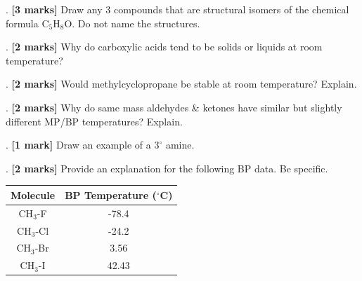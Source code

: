 \documentclass[11pt,letterpaper]{article}
\begin{document}
\newpage
\noindent


\vspace{0.4cm}
. \textbf{[3 marks]} Draw any 3 compounds that are structural isomers of the chemical formula $\text{C}_5\text{H}_8\text{O}$. Do not name the structures.
\vspace{4.0cm}

. \textbf{[2 marks]} Why do carboxylic acids tend to be solids or liquids at room temperature?
\vspace{2.0cm}

. \textbf{[2 marks]} Would methylcyclopropane \;\; be stable at room temperature? Explain.
\vspace{2.5cm}

. \textbf{[2 marks]} Why do same mass aldehydes \& ketones have similar but slightly different MP/BP temperatures? Explain.
\vspace{2.5cm}

. \textbf{[1 mark]} Draw an example of a $3^\circ$ amine.
\vspace{2.0cm}

. \textbf{[2 marks]} Provide an explanation for the following BP data. Be specific.

\vspace{0.3cm}
\noindent
\begin{minipage}[t]{0.55\textwidth}
\vspace{0.1cm}
\vspace{3.0cm}
\end{minipage}
\hfill
\begin{minipage}[t]{0.4\textwidth}
\centering
\begin{tabular}{|c|c|}
\hline
\textbf{Molecule} & \textbf{BP Temperature ($^\circ$C)} \\
\hline
CH$_3$-F & -78.4 \\
\hline
CH$_3$-Cl & -24.2 \\
\hline
CH$_3$-Br & 3.56 \\
\hline
CH$_3$-I & 42.43 \\
\hline
\end{tabular}
\end{minipage}
\end{document}
